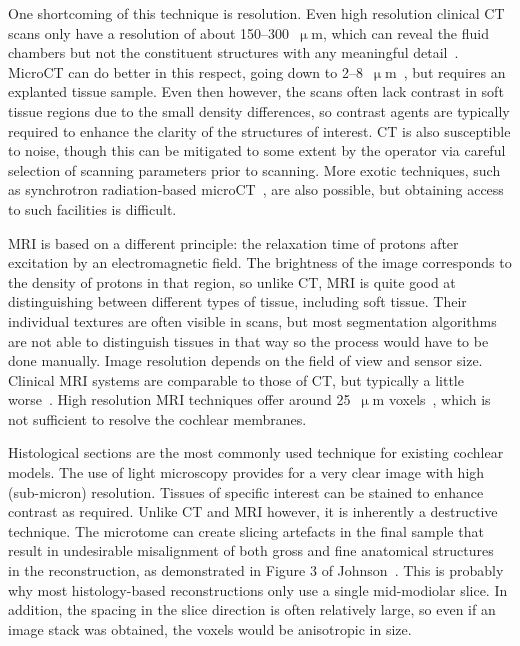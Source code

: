 One shortcoming of this technique is resolution. Even high resolution clinical
CT scans only have a resolution of about 150--300~$ \upmu $m, which can reveal
the fluid chambers but not the constituent structures with any meaningful
detail~\cite{escude2006,connor2009,verbist2010thesis,santi2011}. MicroCT can do
better in this respect, going down to 2--8~$ \upmu
$m~\cite{muller2006anatomy,mondy2009thesis}, but requires an explanted tissue
sample. Even then however, the scans often lack contrast in soft tissue regions
due to the small density differences, so contrast agents are typically required
to enhance the clarity of the structures of interest. CT is also susceptible to
noise, though this can be mitigated to some extent by the operator via careful
selection of scanning parameters prior to scanning. More exotic techniques, such
as synchrotron radiation-based microCT~\cite{muller2006anatomy}, are also
possible, but obtaining access to such facilities is difficult.

MRI is based on a different principle: the relaxation time of protons after
excitation by an electromagnetic field. The brightness of the image corresponds
to the density of protons in that region, so unlike CT, MRI is quite good at
distinguishing between different types of tissue, including soft tissue. Their
individual textures are often visible in scans, but most segmentation algorithms
are not able to distinguish tissues in that way so the process would have to be
done manually. Image resolution depends on the field of view and sensor size.
Clinical MRI systems are comparable to those of CT, but typically a little
worse~\cite{santi2011}. High resolution MRI techniques offer around 25~$ \upmu
$m voxels~\cite{ghiz2001,silver2002}, which is not sufficient to resolve the
cochlear membranes.


Histological sections are the most commonly used technique for existing cochlear
models. The use of light microscopy provides for a very clear image with high
(sub-micron) resolution. Tissues of specific interest can be stained to enhance
contrast as required. Unlike CT and MRI however, it is inherently a destructive
technique. The microtome can create slicing artefacts in the final sample that
result in undesirable misalignment of both gross and fine anatomical
structures~\cite{hofman2009} in the reconstruction, as demonstrated in Figure 3
of Johnson~\cite{johnson2014}. This is probably why most histology-based
reconstructions only use a single mid-modiolar slice. In addition, the spacing
in the slice direction is often relatively large, so even if an image stack was
obtained, the voxels would be anisotropic in size.


